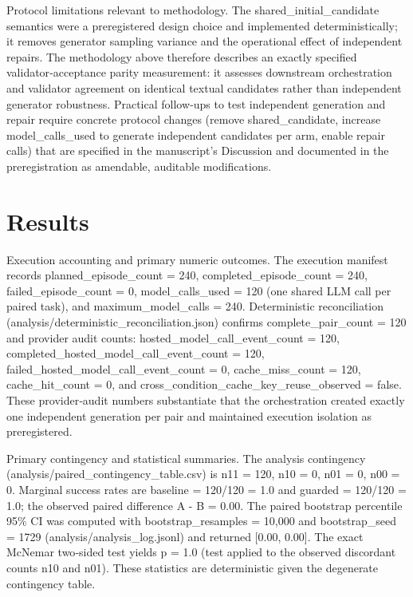\documentclass[conference]{IEEEtran}
\begin{document}
Protocol limitations relevant to methodology. The shared\_initial\_candidate semantics were a preregistered design choice and implemented deterministically; it removes generator sampling variance and the operational effect of independent repairs. The methodology above therefore describes an exactly specified validator‑acceptance parity measurement: it assesses downstream orchestration and validator agreement on identical textual candidates rather than independent generator robustness. Practical follow‑ups to test independent generation and repair require concrete protocol changes (remove shared\_candidate, increase model\_calls\_used to generate independent candidates per arm, enable repair calls) that are specified in the manuscript's Discussion and documented in the preregistration as amendable, auditable modifications.

\section{Results}
Execution accounting and primary numeric outcomes. The execution manifest records planned\_episode\_count = 240, completed\_episode\_count = 240, failed\_episode\_count = 0, model\_calls\_used = 120 (one shared LLM call per paired task), and maximum\_model\_calls = 240. Deterministic reconciliation (analysis/deterministic\_reconciliation.json) confirms complete\_pair\_count = 120 and provider audit counts: hosted\_model\_call\_event\_count = 120, completed\_hosted\_model\_call\_event\_count = 120, failed\_hosted\_model\_call\_event\_count = 0, cache\_miss\_count = 120, cache\_hit\_count = 0, and cross\_condition\_cache\_key\_reuse\_observed = false. These provider‑audit numbers substantiate that the orchestration created exactly one independent generation per pair and maintained execution isolation as preregistered.

Primary contingency and statistical summaries. The analysis contingency (analysis/paired\_contingency\_table.csv) is n11 = 120, n10 = 0, n01 = 0, n00 = 0. Marginal success rates are baseline = 120/120 = 1.0 and guarded = 120/120 = 1.0; the observed paired difference A - B = 0.00. The paired bootstrap percentile 95\% CI was computed with bootstrap\_resamples = 10,000 and bootstrap\_seed = 1729 (analysis/analysis\_log.jsonl) and returned [0.00, 0.00]. The exact McNemar two‑sided test yields p = 1.0 (test applied to the observed discordant counts n10 and n01). These statistics are deterministic given the degenerate contingency table.
\end{document}
